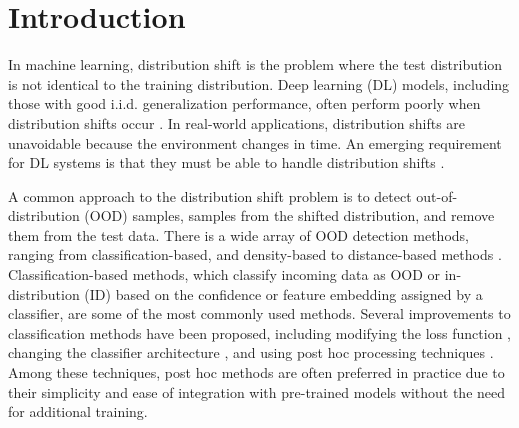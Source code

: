 \documentclass[nohyperref]{article}
\theoremstyle{plain}
\theoremstyle{definition}
\theoremstyle{remark}
\newcommand{\Fullname}{Class Typical Matching}
\newcommand{\shortname}{CTM}
\begin{document}
\begin{abstract}
    The ability to detect OOD data is a crucial aspect of practical machine learning applications.
    In this work, we show that cosine similarity between the test feature and the typical ID feature is a good indicator of OOD data.
    We propose \Fullname\;(\shortname), a post hoc OOD detection algorithm that uses a cosine similarity scoring function.
    Extensive experiments on multiple benchmarks show that \shortname\;outperforms existing post hoc OOD detection methods.
\end{abstract}

\section{Introduction}
In machine learning, distribution shift is the problem where the test distribution is not identical to the training distribution.
Deep learning (DL) models, including those with good i.i.d. generalization performance, often perform poorly when distribution shifts occur \cite{Nguyen2014}.
In real-world applications, distribution shifts are unavoidable because the environment changes in time.
An emerging requirement for DL systems is that they must be able to handle distribution shifts \cite{AmodeiOSCSM16}. 

A common approach to the distribution shift problem is to detect out-of-distribution (OOD) samples, samples from the shifted distribution, and remove them from the test data.
There is a wide array of OOD detection methods, ranging from classification-based, and density-based to distance-based methods \cite{Yang2021Survey}. 
Classification-based methods, which classify incoming data as OOD or in-distribution (ID) based on the confidence or feature embedding assigned by a classifier, are some of the most commonly used methods. 
Several improvements to classification methods have been proposed, including modifying the loss function \cite{wei2022logitnorm, ming2023how}, changing the classifier architecture \cite{Malinin2018Predictive}, and using post hoc processing techniques \cite{hendrycks17baseline, Liang2017, liu2020energy, mahalanobis}. 
Among these techniques, post hoc methods are often preferred in practice due to their simplicity and ease of integration with pre-trained models without the need for additional training. 
\end{document}
